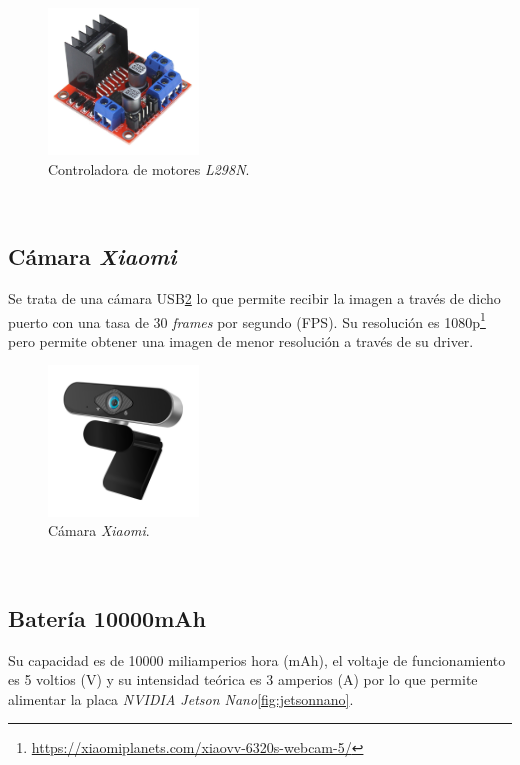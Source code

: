 \begin{figure} [h!]
	\begin{center}
		\includegraphics[width=4cm]{figs/l298n}
	\end{center}
	\caption{Controladora de motores \textit{L298N}.}
	\label{fig:l298n}
\end{figure}\

\subsection{Cámara \textit{Xiaomi}}
\label{subsection:xiaomicamera}
Se trata de una cámara USB\ref{fig:xiaomicamera} lo que permite recibir la imagen a través de dicho puerto con una tasa de 30 \textit{frames} por segundo (FPS). Su resolución es 1080p\footnote{\url{https://xiaomiplanets.com/xiaovv-6320s-webcam-5/}} pero permite obtener una imagen de menor resolución a través de su driver.\\

\begin{figure} [h!]
	\begin{center}
		\includegraphics[width=4cm]{figs/camera}
	\end{center}
	\caption{Cámara \textit{Xiaomi}.}
	\label{fig:xiaomicamera}
\end{figure}\

\subsection{Batería 10000mAh}
\label{subsection:battery}
Su capacidad es de 10000 miliamperios hora (mAh), el voltaje de funcionamiento es 5 voltios (V) y su intensidad teórica es 3 amperios (A) por lo que permite alimentar la placa \textit{NVIDIA Jetson Nano}\ref{fig:jetsonnano}.\\

